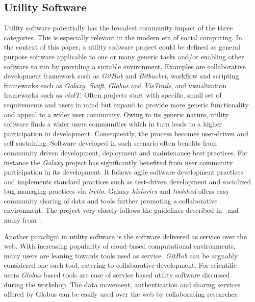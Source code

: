 \documentclass[11pt, oneside]{amsart}
\begin{document}
\subsection{Utility Software}
Utility software potentially has the broadest community impact of the three
categories. This is especially relevant in the modern era of social computing.
In the context of this paper, a utility software project could be defined as
general purpose software applicable to one or many generic tasks and/or
enabling other software to run by providing a suitable environment. Examples
are collaborative development framework such as \emph{GitHub} and
\emph{Bitbucket}, workflow and scripting frameworks such as \emph{Galaxy},
\emph{Swift}, \emph{Globus} and \emph{VisTrails}, and visualization frameworks
such as \emph{visIT}. Often projects start with specific, small set of
requirements and users in mind but expand to provide more generic functionality
and appeal to a wider user community. Owing to its generic nature, utility
software finds a wider users communities which in turn leads to a higher
participation in development. Consequently, the process becomes user-driven and
self sustaining. Software developed in such scenario often benefits from
community driven development, deployment and maintenance best practices. For
instance the \emph{Galaxy} project has significantly benefited from user
community participation in its development. It follows agile software
development practices and implements standard practices such as test-driven
development and socialized bug managing practices via \emph{trello}. Galaxy
\emph{histories} and \emph{toolshed} offers easy community sharing of data and
tools further promoting a collaborative environment. The project very closely
follows the guidelines described in~\cite{Carver_WSSSPE} and many
from~\cite{Prlic_WSSSPE}. 

Another paradigm in utility software is the software delivered as service over
the web. With increasing popularity of cloud-based computational environments,
many users are leaning towards tools used as service. \emph{GitHub} can be
arguably considered one such tool, catering to collaborative development. For
scientific users \emph{Globus} based tools are case of service based utility
software discussed during the workshop. The data movement, authentication and
sharing services offered by Globus can be easily used over the web by
collaborating researcher.
\end{document}
